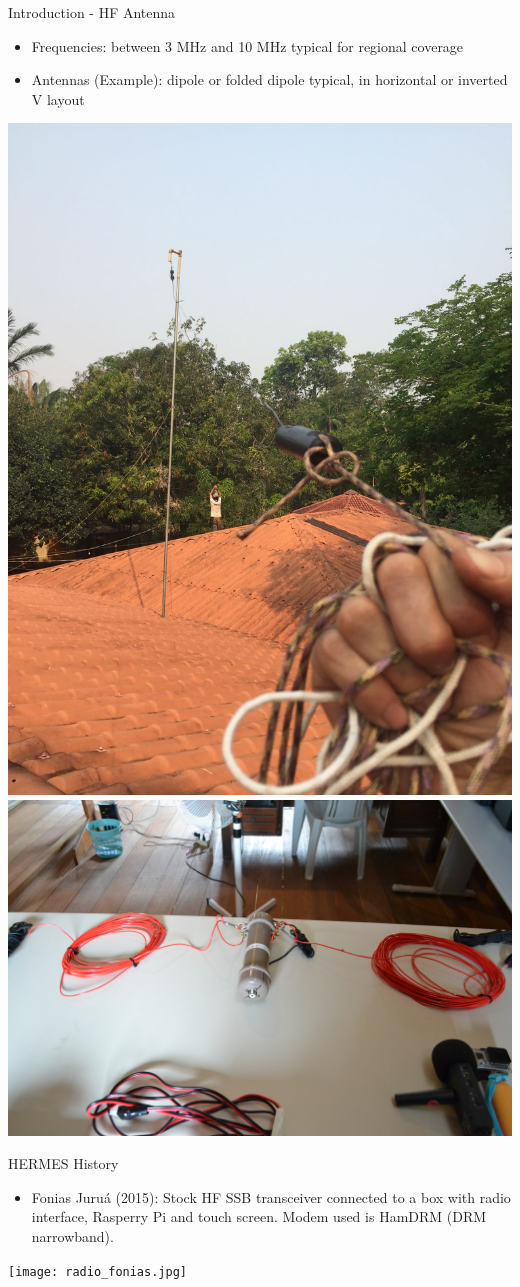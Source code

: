 \documentclass[aspectratio=169,xcolor={x11names,svgnames,dvipsnames}]{beamer}
\begin{document}
\begin{frame}{Introduction - HF Antenna}

  \begin{itemize}
  \item Frequencies: between 3 MHz and 10 MHz typical for regional coverage
  \item Antennas (Example): dipole or folded dipole typical, in horizontal or inverted V layout
  \end{itemize}


  \begin{center}
    \includegraphics[width=.39\columnwidth]{antena.jpeg}
    \includegraphics[width=.51\columnwidth]{antena.jpg}
  \end{center}

\end{frame}

\begin{frame}{HERMES History}

  \begin{itemize}
    \item Fonias Juruá (2015): Stock HF SSB transceiver connected to a box with radio interface, Rasperry Pi and touch screen. Modem used is HamDRM (DRM narrowband).
  \end{itemize}
\begin{center}
  \texttt{[image: radio\_fonias.jpg]}
\end{center}

\end{frame}
\end{document}

